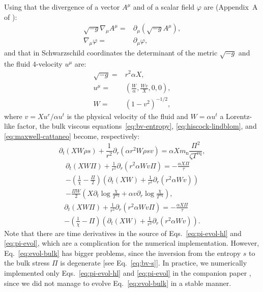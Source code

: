 \documentclass[aps,prd,twocolumn,a4paper,floatfix,nofootbib,superscriptaddress,nofootinbib]{revtex4}
\newcommand{\rn}{\mathrm{n}}
\newcommand{\req}{\mathrm{eq}}
\begin{document}
Using that the divergence of a vector
$A^\mu$ and of a scalar field $\varphi$ are (Appendix~A of \citet{OConnor10}):
\begin{align}
\sqrt{-g}\nabla_\mu A^\mu={}&\partial_\mu (\sqrt{-g}A^\mu),\\
\nabla_\mu \varphi={}&\partial_\mu\varphi,
\end{align}
and that in Schwarzschild coordinates the determinant of the metric $\sqrt{-g}$
and the fluid 4-velocity $u^\mu$ are:
\begin{align}
\sqrt{-g}={}&r^2\alpha X,\\
u^\mu={}&\left(\frac{W}\alpha,\frac{Wv}X,0,0\right),\\
\label{eq:w}
W={}&\left(1 - v^2\right)^{-1/2},
\end{align}
where $v=Xu^r/\alpha u^t$ is the physical velocity of the fluid
and $W=\alpha u^t$ a Lorentz-like factor, the bulk viscous
equations~\eqref{eq:bv-entropy}, \eqref{eq:hiscock-lindblom}, and
\eqref{eq:maxwell-cattaneo} become, respectively:
%
\begin{equation}
\label{eq:evol-bulk}
\partial_t (XW\rho s)
+\frac1{r^2}\partial_r\left(\alpha r^2 W\rho s v\right)=\alpha Xm_\rn\frac{\Pi^2}{\zeta T^\req},
\end{equation}
%
\begin{multline}
\label{eq:pi-evol-hl}
\partial_t(XW\Pi) + \frac1{r^2}\partial_r\left(r^2\alpha Wv\Pi\right) = -\frac{\alpha X\Pi}{\tau}\\
-\left(\frac1\chi-\frac{\Pi}2\right)\left(\partial_t (XW) +\frac1{r^2}\partial_r(r^2\alpha Wv)\right)\\
-\frac{\Pi W}2\left(X\partial_t\log\frac\chi{T^\req}+\alpha v\partial_r\log\frac\chi{T^\req}\right),
\end{multline}
%
\begin{multline}
\label{eq:pi-evol}
\partial_t(XW\Pi) + \frac1{r^2}\partial_r\left(r^2\alpha Wv\Pi\right) = -\frac{\alpha X\Pi}{\tau}\\
-\left(\frac1\chi-\Pi\right)\left(\partial_t (XW) +\frac1{r^2}\partial_r(r^2\alpha Wv)\right).
\end{multline}
%
Note that there are time
derivatives in the source of Eqs.~\eqref{eq:pi-evol-hl} and \eqref{eq:pi-evol},
which are a complication for the numerical implementation. However,
Eq.~\eqref{eq:evol-bulk} has bigger problems, since the inversion from the
entropy $s$ to the bulk stress $\Pi$ is degenerate [see Eq.~\eqref{eq:bv-s}].
In practice, we numerically implemented only Eqs.~\eqref{eq:pi-evol-hl} and
\eqref{eq:pi-evol} in the companion paper \cite{Camelio22b, Camelio22code}, since we did not
manage to evolve Eq.~\eqref{eq:evol-bulk} in a stable manner.
\end{document}
